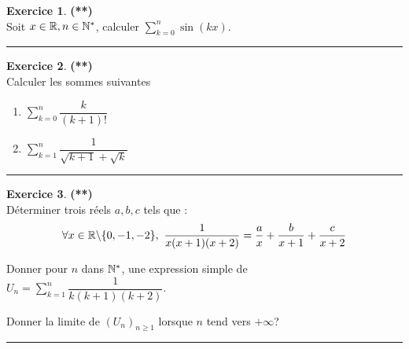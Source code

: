 \documentclass[a4paper,11pt]{article}
\theoremstyle{definition}
\newtheorem{exo}{Exercice} %
\begin{document}
\begin{exo}\textbf{(**)}\quad\\[0.2cm]
	Soit $x\in\mathbb{R}, n \in \mathbb{N}^{*}$,
	calculer $\displaystyle\sum_{k=0}^{n}{\sin(kx)}$.
	
	\centering
	\rule{1\linewidth}{0.6pt}
\end{exo}
\newpage


\begin{exo}\textbf{(**)}\quad\\[0.2cm]
	
	Calculer les sommes suivantes 
	\begin{enumerate}
		\item $ \displaystyle\sum\limits_{k=0}^{n}{\dfrac{k}{(k+1)!}}$
		\item $ \displaystyle\sum\limits_{k=1}^{n}{\dfrac{1}{\sqrt{k+1} + \sqrt{k}}}$ 
	\end{enumerate}
	
	
	\centering
	\rule{1\linewidth}{0.6pt}
\end{exo}

\begin{exo}\textbf{(**)}\quad\\[0.2cm]
	Déterminer trois réels $a, b, c$ tels que :\quad\\[0.25cm]
	
$$\forall x\in\R\backslash\{0,-1,-2\},\ \dfrac{1}{x(x+1)(x+2)} = \dfrac{a}{x} + \dfrac{b}{x+1} + \dfrac{c}{x+2}$$
	
	Donner pour $n$ dans $\mathbb{N}^*$, une expression simple de\quad\\[0.25cm]
	
	\centering$ U_n = \displaystyle\sum\limits_{k=1}^{n}{\dfrac{1}{k(k+1)(k+2)}}$.\quad\\[0.25cm]
	
	\raggedright Donner la limite de $(U_n)_{n\geq 1}$ lorsque $n$ tend vers $+\infty$?
	
	\centering
	\rule{1\linewidth}{0.6pt}
\end{exo}
\end{document}
